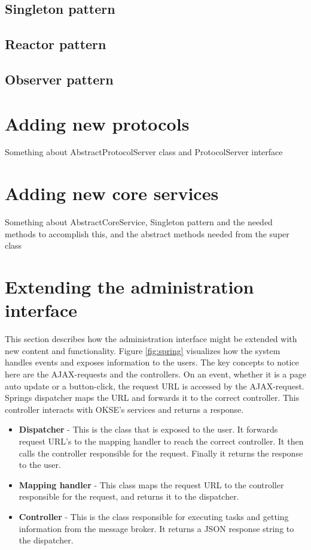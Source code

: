\subsection{Singleton pattern}

\subsection{Reactor pattern}

\subsection{Observer pattern}

\section{Adding new protocols}
\label{sec:adding-new-protocols}

Something about AbstractProtocolServer class and ProtocolServer interface

\section{Adding new core services}
\label{sec:adding-new-core-services}

Something about AbstractCoreService, Singleton pattern and the needed methods to accomplish this, and the abstract methods needed from the super class

\section{Extending the administration interface}
\label{sec:adding-new-panes}

This section describes how the administration interface might be extended with new content and functionality. Figure \ref{fig:spring} visualizes how the system handles events and exposes information to the users. The key concepts to notice here are the AJAX-requests and the controllers. On an event, whether it is a page auto update or a button-click, the request URL is accessed by the AJAX-request. Springs dispatcher maps the URL and forwards it to the correct controller. This controller interacts with OKSE's services and returns a response.

\begin{itemize}
    \item\textbf{Dispatcher} -  This is the class that is exposed to the user. It forwards request URL's to the mapping handler to reach the correct controller. It then calls the controller responsible for the request. Finally it returns the response to the user. 
    \item\textbf{Mapping handler} - This class maps the request URL to the controller responsible for the request, and returns it to the dispatcher. 
    \item\textbf{Controller} - This is the class responsible for executing tasks and getting information from the message broker. It returns a JSON response \cite{json} string to the dispatcher.  
\end{itemize}

